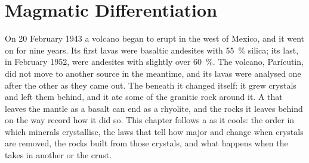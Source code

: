 \chapter{Magmatic Differentiation}\label{ch:b2:magmatic-differentiation}

On 20 February 1943 a volcano began to erupt in the west of Mexico, and it went on
for nine years. Its first lavas were basaltic andesites with \qty{55}{\percent}
silica; its last, in February 1952, were andesites with slightly over
\qty{60}{\percent}. The volcano, Parícutin, did not move to another source in the
meantime, and its lavas were analysed one after the other as they came out. The
 beneath it changed itself: it grew crystals and left them behind, and it ate
some of the granitic rock around it. A  that leaves the mantle as a basalt can
end as a rhyolite, and the rocks it leaves behind on the way record how it did so.
This chapter follows a  as it cools: the order in which minerals crystallise,
the laws that tell how major and  change when crystals are removed,
the rocks built from those crystals, and what happens when the  takes in
another  or the crust.

